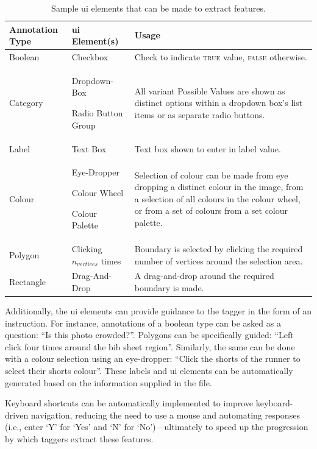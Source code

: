 \begin{table}
  \centering
  \caption[Sample UI elements to extract features in Argus]{Sample \gls{ui} elements that can be made to extract features.}
  \label{tab:dataset:process:ui_elements}
    \begin{tabular}{lp{}p{}}
    \toprule
      \bfseries Annotation Type &
      \bfseries \gls{ui} Element(s) &
      \bfseries Usage
    \\
    \midrule
      Boolean &
      Checkbox &
      Check to indicate \textsc{true} value, \textsc{false} otherwise.
    \\
      Category &
      { Dropdown-Box \par Radio Button Group } &
      All variant Possible Values are shown as distinct options within a dropdown box's list items or as separate radio buttons.
    \\
      Label &
      Text Box &
      Text box shown to enter in label value.
    \\
      Colour &
      { Eye-Dropper \par Colour Wheel \par Colour Palette } &
      Selection of colour can be made from eye dropping a distinct colour in the image, from a selection of all colours in the colour wheel, or from a set of colours from a set colour palette.
    \\
      Polygon &
      Clicking $n_{vertices}$ times &
      Boundary is selected by clicking the required number of vertices around the selection area.
    \\
      Rectangle &
      Drag-And-Drop &
      A drag-and-drop around the required boundary is made.
    \\
    \bottomrule
    \end{tabular}
\end{table}

Additionally, the \gls{ui} elements can provide guidance to the tagger in the form of an instruction. For instance, annotations of a boolean type can be asked as a question: ``Is this photo crowded?''. Polygons can be specifically guided: ``Left click four times around the bib sheet region''. Similarly, the same can be done with a colour selection using an eye-dropper: ``Click the shorts of the runner to select their shorts colour''. These labels and \gls{ui} elements can be automatically generated based on the information supplied in the  file.

Keyboard shortcuts can be automatically implemented to improve keyboard-driven navigation, reducing the need to use a mouse and automating responses (i.e., enter `Y' for `Yes' and `N' for `No')---ultimately to speed up the progression by which taggers extract these features.

